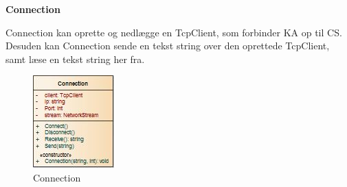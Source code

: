 \textbf{Connection}

Connection kan oprette og nedlægge en TcpClient, som forbinder \gls{KA} op til \gls{CS}. Desuden kan Connection sende en tekst string over den oprettede TcpClient, samt læse en tekst string her fra.

\begin{figure}[H]
    \centering
    \includegraphics[]{Systemdesign/Frontend/DAL/Pics/Connection}
    \caption{Connection}
    \label{fig:Connection}
\end{figure}

\bigskip